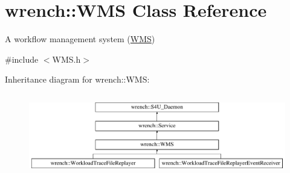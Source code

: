 \hypertarget{classwrench_1_1_w_m_s}{}\section{wrench\+:\+:W\+MS Class Reference}
\label{classwrench_1_1_w_m_s}


A workflow management system (\hyperlink{classwrench_1_1_w_m_s}{W\+MS})  




{\ttfamily \#include $<$W\+M\+S.\+h$>$}

Inheritance diagram for wrench\+:\+:W\+MS\+:\begin{figure}[H]
\begin{center}
\leavevmode
\includegraphics[height=3.624595cm]{classwrench_1_1_w_m_s}
\end{center}
\end{figure}
